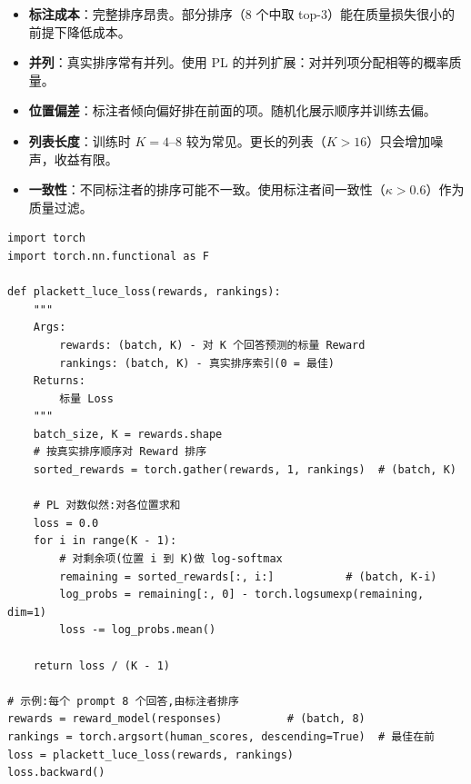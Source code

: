 \begin{warningbox}
\begin{itemize}
  \item \textbf{标注成本}：完整排序昂贵。部分排序（8 个中取 top-3）能在质量损失很小的前提下降低成本。
  \item \textbf{并列}：真实排序常有并列。使用 PL 的并列扩展：对并列项分配相等的概率质量。
  \item \textbf{位置偏差}：标注者倾向偏好排在前面的项。随机化展示顺序并训练去偏。
  \item \textbf{列表长度}：训练时 $K=4$--8 较为常见。更长的列表（$K>16$）只会增加噪声，收益有限。
  \item \textbf{一致性}：不同标注者的排序可能不一致。使用标注者间一致性（$\kappa > 0.6$）作为质量过滤。
\end{itemize}
\end{warningbox}

\begin{examplebox}
\begin{lstlisting}[style=pythonstyle]
import torch
import torch.nn.functional as F

def plackett_luce_loss(rewards, rankings):
    """
    Args:
        rewards: (batch, K) - 对 K 个回答预测的标量 Reward
        rankings: (batch, K) - 真实排序索引(0 = 最佳)
    Returns:
        标量 Loss
    """
    batch_size, K = rewards.shape
    # 按真实排序顺序对 Reward 排序
    sorted_rewards = torch.gather(rewards, 1, rankings)  # (batch, K)

    # PL 对数似然:对各位置求和
    loss = 0.0
    for i in range(K - 1):
        # 对剩余项(位置 i 到 K)做 log-softmax
        remaining = sorted_rewards[:, i:]           # (batch, K-i)
        log_probs = remaining[:, 0] - torch.logsumexp(remaining, dim=1)
        loss -= log_probs.mean()

    return loss / (K - 1)

# 示例:每个 prompt 8 个回答,由标注者排序
rewards = reward_model(responses)          # (batch, 8)
rankings = torch.argsort(human_scores, descending=True)  # 最佳在前
loss = plackett_luce_loss(rewards, rankings)
loss.backward()
\end{lstlisting}
\end{examplebox}

